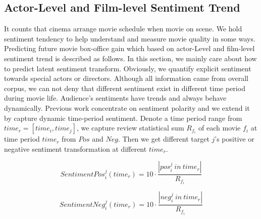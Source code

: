 
\subsection{Actor-Level and Film-level Sentiment Trend}
\par It counts that cinema arrange movie schedule when movie on scene. We hold sentiment tendency to help understand and measure movie quality in some ways. Predicting future movie box-office gain which based on actor-Level and film-level sentiment trend is described as follows. In this section, we mainly care about how to predict latent sentiment transform. Obviously, we quantify explicit sentiment towards special actors or directors. Although all information came from overall corpus, we can not deny that different sentiment exist in different time period during movie life. Audience's sentiments have trends and always behave dynamically. Previous work concentrate on sentiment polarity and we extend it by capture dynamic time-period sentiment. Denote a time period range from $time_r = [time_i, time_j]$, we capture review statistical sum $R_{f_i}$ of each movie $f_i$ at time period $time_r$ from $Pos$ and $Neg$. Then we get different target $j$'s positive or negative sentiment transformation at different $time_r$.

\begin{equation}
    SentimentPos^j_i (time_r) = 10\cdot \frac{|pos^j_i \ in \ time_r|}{R_{f_i}}
\end{equation}

\begin{equation}
    SentimentNeg^j_i (time_r) = 10\cdot \frac{|neg^j_i \ in \ time_r|}{R_{f_i}}
\end{equation}

